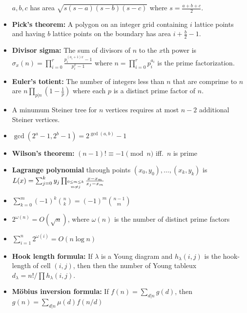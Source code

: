 \documentclass[9pt,a4paper,twocolumn,landscape,oneside]{amsart}
\newif\ifverbose
\begin{document}
\begin{itemize}[leftmargin=*]
                $a,b,c$ has area $\sqrt{s(s-a)(s-b)(s-c)}$ where $s =
                \frac{a+b+c}{2}$.
            \item \textbf{Pick's theorem:} A polygon on an integer grid
                containing $i$ lattice points and having $b$ lattice points on
                the boundary has area $i + \frac{b}{2} - 1$.
            \item \textbf{Divisor sigma:} The sum of divisors of $n$ to the
                $x$th power is $\sigma_x(n) = \prod_{i=0}^{r} \frac{p_i^{(a_i +
                1)x} - 1}{p_i^x - 1}$ where $n = \prod_{i=0}^r p_i^{a_i}$ is
                the prime factorization.
            \ifverbose
            \item \textbf{Divisor count:} A special case of the above is
                $\sigma_0(n) = \prod_{i=0}^r (a_i + 1)$.
            \fi
            \item \textbf{Euler's totient:} The number of integers less than
                $n$ that are comprime to $n$ are $n\prod_{p|n}\left(1 - \frac{1}{p}\right)$
                where each $p$ is a distinct prime factor of $n$.
            \ifverbose
            \item \textbf{König's theorem:} In any bipartite graph, the number
                of edges in a maximum matching is equal to the number of
                vertices in a minimum vertex cover.
            \fi
            \item A minumum Steiner tree for $n$ vertices requires at most $n-2$ additional Steiner vertices.
            \ifverbose
            \item The number of vertices of a graph is equal to its minimum
                vertex cover number plus the size of a maximum independent set.
            \fi
            \item $\gcd(2^a-1,2^b-1) = 2^{\gcd(a,b)}-1$
            \item \textbf{Wilson's theorem:} $(n-1)! \equiv -1 \pmod{n}$ iff.\ $n$ is prime
            \item \textbf{Lagrange polynomial} through points $(x_0,y_0),\ldots,(x_k,y_k)$ is $L(x) = \sum_{j=0}^k y_j \prod_{\shortstack{$\scriptscriptstyle 0\leq m \leq k$ \\ $\scriptscriptstyle m\neq j$}} \frac{x-x_m}{x_j - x_m}$
            \item $\sum_{k=0}^m (-1)^k \binom{n}{k} = (-1)^m \binom{n-1}{m}$
            \item $2^{\omega(n)} = O(\sqrt{n})$, where $\omega(n)$ is the number of distinct prime factors
            \item $\sum_{i=1}^n 2^{\omega(i)} = O(n \log n)$
            \item \textbf{Hook length formula:} If $\lambda$ is a Young diagram and $h_{\lambda}(i,j)$ is the hook-length of cell $(i,j)$, then then the number of Young tableux $d_{\lambda} = n!/\prod h_{\lambda}(i,j)$.
            \item \textbf{Möbius inversion formula:} If $f(n) = \sum_{d|n} g(d)$, then $g(n) = \sum_{d|n} \mu(d) f(n/d)$
        \end{itemize}
\end{document}
